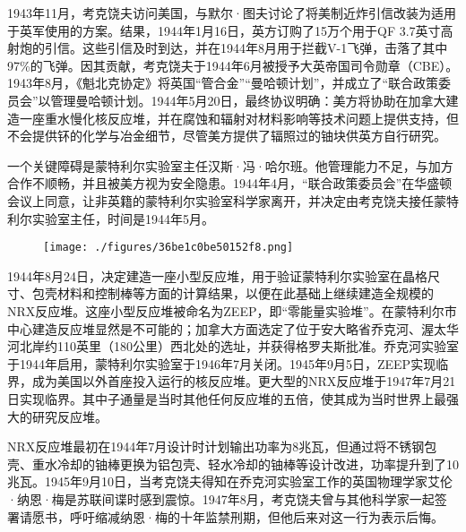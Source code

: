 1943年11月，考克饶夫访问美国，与默尔·图夫讨论了将美制近炸引信改装为适用于英军使用的方案。结果，1944年1月16日，英方订购了15万个用于QF 3.7英寸高射炮的引信。这些引信及时到达，并在1944年8月用于拦截V-1飞弹，击落了其中97\%的飞弹。因其贡献，考克饶夫于1944年6月被授予大英帝国司令勋章（CBE）。1943年8月，《魁北克协定》将英国“管合金”“曼哈顿计划”，并成立了“联合政策委员会”以管理曼哈顿计划。1944年5月20日，最终协议明确：美方将协助在加拿大建造一座重水慢化核反应堆，并在腐蚀和辐射对材料影响等技术问题上提供支持，但不会提供钚的化学与冶金细节，尽管美方提供了辐照过的铀块供英方自行研究。

一个关键障碍是蒙特利尔实验室主任汉斯·冯·哈尔班。他管理能力不足，与加方合作不顺畅，并且被美方视为安全隐患。1944年4月，“联合政策委员会”在华盛顿会议上同意，让非英籍的蒙特利尔实验室科学家离开，并决定由考克饶夫接任蒙特利尔实验室主任，时间是1944年5月。
\begin{figure}[ht]
\centering
\texttt{[image: ./figures/36be1c0be50152f8.png]}
\caption{} \label{fig_YHkrf_6}
\end{figure}
1944年8月24日，决定建造一座小型反应堆，用于验证蒙特利尔实验室在晶格尺寸、包壳材料和控制棒等方面的计算结果，以便在此基础上继续建造全规模的NRX反应堆。这座小型反应堆被命名为ZEEP，即“零能量实验堆”。在蒙特利尔市中心建造反应堆显然是不可能的；加拿大方面选定了位于安大略省乔克河、渥太华河北岸约110英里（180公里）西北处的选址，并获得格罗夫斯批准。乔克河实验室于1944年启用，蒙特利尔实验室于1946年7月关闭。1945年9月5日，ZEEP实现临界，成为美国以外首座投入运行的核反应堆。更大型的NRX反应堆于1947年7月21日实现临界。其中子通量是当时其他任何反应堆的五倍，使其成为当时世界上最强大的研究反应堆。

NRX反应堆最初在1944年7月设计时计划输出功率为8兆瓦，但通过将不锈钢包壳、重水冷却的铀棒更换为铝包壳、轻水冷却的铀棒等设计改进，功率提升到了10兆瓦。1945年9月10日，当考克饶夫得知在乔克河实验室工作的英国物理学家艾伦·纳恩·梅是苏联间谍时感到震惊。1947年8月，考克饶夫曾与其他科学家一起签署请愿书，呼吁缩减纳恩·梅的十年监禁刑期，但他后来对这一行为表示后悔。